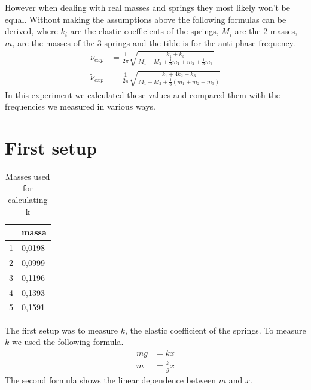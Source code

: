 \documentclass{article}
\begin{document}
However when dealing with real masses and springs they most 
likely won't be equal. Without making the assumptions above 
the following formulas can be derived, where $k_i$ are the elastic coefficients of the springs, $M_i$ are the 2 masses, $m_i$ are the masses of the 3 springs and the tilde is for the anti-phase frequency.
\begin{align}
           \nu_{exp} &= \frac{1}{2\pi}   \sqrt{\frac{k_1+k_3}
           {M_1 + M_2 + \frac{1}{3} m_1 + m_2 + \frac{1}{3}m_3 }} 
           \label{eq:nuexp}  \\
    \tilde \nu_{exp} &= \frac{1}{2\pi}   \sqrt{\frac{k_1 +4k_2 +k_3}
           {M_1 + M_2 + \frac{1}{3} (m_1 + m_2 + m_3) }} 
           \label{eq:antinuexp} 
\end{align}
In this experiment we calculated these values and compared them with the frequencies we measured in various ways. 


\section{First setup} \label{sec:setup1}
\begin{table}
    \centering
    \begin{tabular}{|l|l|}
    \hline
         & massa \\ \hline
        1 & 0,0198 \\ \hline
        2 & 0,0999 \\ \hline
        3 & 0,1196 \\ \hline
        4 & 0,1393 \\ \hline
        5 & 0,1591 \\ \hline
    \end{tabular}
    \caption{Masses used for calculating k}
    \label{tab:regm}
\end{table}
The first setup was to measure $k$, the elastic coefficient of the springs. 
To measure $k$ we used the following formula.
\begin{align}
    mg &= kx \\
    m  &= \frac{k}{g}x
\end{align}
The second formula shows the linear dependence between $m$ and $x$.
\end{document}
